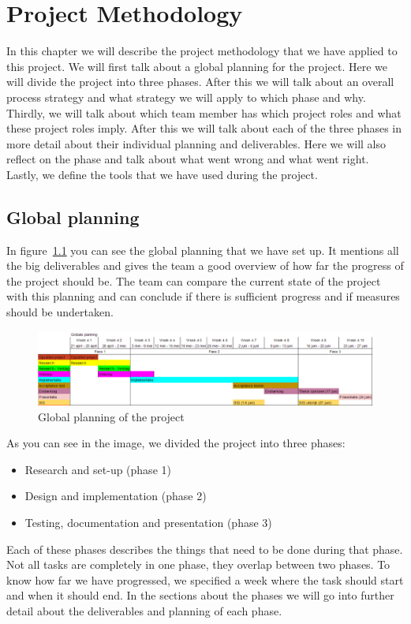 \chapter{Project Methodology}
In this chapter we will describe the project methodology that we have applied to this project.
We will first talk about a global planning for the project.
Here we will divide the project into three phases.
After this we will talk about an overall process strategy and what strategy we will apply to which phase and why.
Thirdly, we will talk about which team member has which project roles and what these project roles imply.
After this we will talk about each of the three phases in more detail about their individual planning and deliverables.
Here we will also reflect on the phase and talk about what went wrong and what went right.
Lastly, we define the tools that we have used during the project.

\section{Global planning}
In figure~\ref{global_planning} you can see the global planning that we have set up.
It mentions all the big deliverables and gives the team a good overview of how far the progress of the project should be.
The team can compare the current state of the project with this planning and can conclude if there is sufficient progress and if measures should be undertaken.

\begin{figure}[h]
    \centering
    \includegraphics[width=\textwidth]{images/Global_planning}
    \caption{Global planning of the project}
    \label{global_planning}
\end{figure}

As you can see in the image, we divided the project into three phases:
\begin{itemize}
\item Research and set-up (phase 1)
\item Design and implementation (phase 2)
\item Testing, documentation and presentation (phase 3)
\end{itemize}
Each of these phases describes the things that need to be done during that phase.
Not all tasks are completely in one phase, they overlap between two phases.
To know how far we have progressed, we specified a week where the task should start and when it should end.
In the sections about the phases we will go into further detail about the deliverables and planning of each phase.

